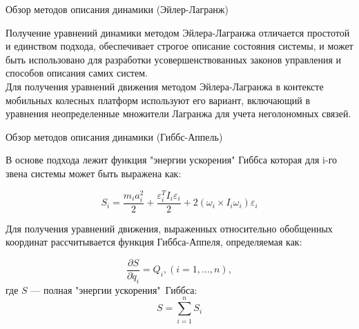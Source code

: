 \documentclass[newPxFont,numfooter,sectionpages]{beamer}
\begin{document}
\begin{frame}{Обзор методов описания динамики (Эйлер-Лагранж)}

	\begin{center}
		\begin{minipage}[b]{0.9\textwidth}
		Получение уравнений динамики методом Эйлера-Лагранжа отличается простотой и единством подхода, обеспечивает строгое описание состояния системы, и может быть использовано для разработки усовершенствованных законов управления и способов описания самих систем.
		\ \\
		
		Для получения уравнений движения методом Эйлера-Лагранжа в контексте мобильных колесных платформ используют его вариант, включающий в уравнения неопределенные множители Лагранжа для учета неголономных связей. 
		\end{minipage}
	\end{center}
\end{frame}

\begin{frame}{Обзор методов описания динамики (Гиббс-Аппель)}

	\begin{center}
		\begin{minipage}[b]{0.9\textwidth}
		В основе подхода лежит функция "энергии ускорения" Гиббса которая для i-го звена системы может быть выражена как:

\begin{equation}
S_i = \frac{m_i a_i^2}{2}  + \frac{\varepsilon_i^T I_i \varepsilon_i}{2}  + 2 (\omega_i \times I_i \omega_i) \varepsilon_i
\tag{18} \label{eq:18}
\end{equation}

Для получения уравнений движения, выраженных относительно обобщенных координат рассчитывается функция Гиббса-Аппеля, определяемая как:

\begin{equation}
\frac{\partial S}{\partial \ddot q_i} = Q_i, (i=1,...,n),
\tag{19} \label{eq:19}
\end{equation}
\noindent
где $S$ --- полная "энергии ускорения"\ Гиббса:
\begin{equation}
S = \sum_{i=1}^n S_i
\tag{20} \label{eq:20}
\end{equation}
		\end{minipage}
	\end{center}
\end{frame}
\end{document}
